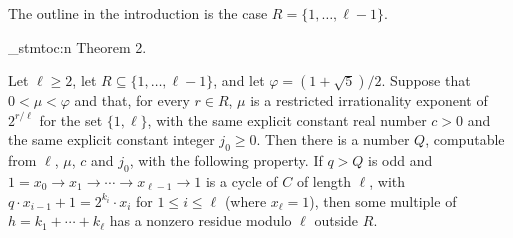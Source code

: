 \documentclass[11pt]{article}
\newenvironment{named}[1]{%
  \par\addvspace{\medskipamount}%
  \pagebreak[3]%
  \noindent{\bfseries #1}\space\ignorespaces
  \stmtoc{#1}%
}{\par\addvspace{\medskipamount}}
\newcommand{\stmtoc}[1]{ \qn_stmtoc:n {#1} }
\begin{document}
The outline in the introduction is the case $R = \{1, \ldots, \ell-1\}$.

\begin{named}{Theorem 2.}
Let $\ell \ge 2$, let $R \subseteq \{1, \ldots, \ell-1\}$, and let $\varphi = (1 + \sqrt{5})/2$.
Suppose that $0 < \mu < \varphi$ and that, for every $r \in R$, $\mu$ is a restricted irrationality exponent of $2^{r/\ell}$ for the set $\{1, \ell\}$, with the same explicit constant real number $c > 0$ and the same explicit constant integer $j_0 \ge 0$.
Then there is a number $Q$, computable from $\ell$, $\mu$, $c$ and $j_0$, with the following property.
If $q > Q$ is odd and $1 = x_0 \to x_1 \to \cdots \to x_{\ell-1} \to 1$ is a cycle of $C$ of length $\ell$, with $q \cdot x_{i-1} + 1 = 2^{k_i} \cdot x_i$ for $1 \le i \le \ell$ (where $x_\ell = 1$), then some multiple of $h = k_1 + \cdots + k_\ell$ has a nonzero residue modulo $\ell$ outside $R$.
\end{named}
\end{document}
